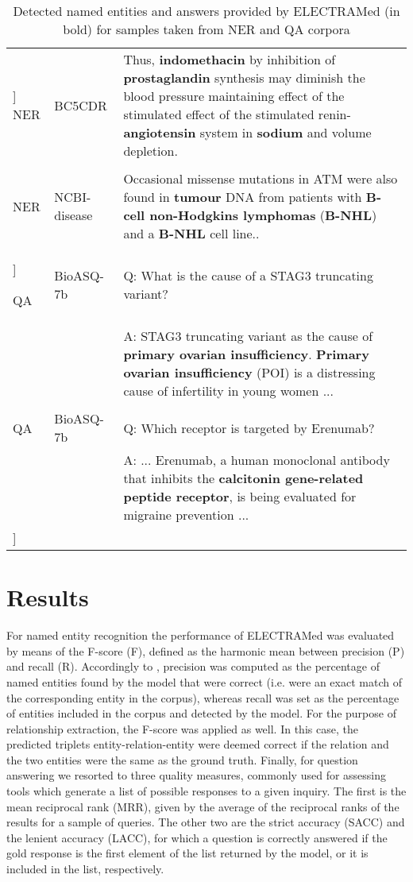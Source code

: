 \documentclass{article}
\begin{document}
\begin{table*}[!t]
\caption{Detected named entities and answers provided by ELECTRAMed (in bold) for samples taken from NER and QA corpora}
\label{table_samples}
\centering 
{\begin{tabular} {p{2cm}p{2cm}p{11cm}} 
\hline \-6pt]
NER & BC5CDR & Thus, \textbf{indomethacin} by inhibition of \textbf{prostaglandin} synthesis may diminish the blood pressure maintaining effect of the stimulated effect of the stimulated renin-\textbf{angiotensin} system in \textbf{sodium} and volume depletion. \\ 
    &   &   \\
NER & NCBI-disease & Occasional missense mutations in ATM were also found in \textbf{tumour} DNA from patients with \textbf{B-cell non-Hodgkins lymphomas} (\textbf{B-NHL}) and a \textbf{B-NHL} cell line.. \\ 
\-6pt]

QA & BioASQ-7b & Q: What is the cause of a STAG3 truncating variant? \\ 
  &           & A: STAG3 truncating variant as the cause of \textbf{primary ovarian insufficiency}. \textbf{Primary ovarian insufficiency} (POI) is a distressing cause of infertility in young women ... \\
    &   &   \\ 
QA & BioASQ-7b & Q: Which receptor is targeted by Erenumab? \\ 
  &           & A: ... Erenumab, a human monoclonal antibody that inhibits the \textbf{calcitonin gene-related peptide receptor}, is being evaluated for migraine prevention ... \\ 
\-6pt]  
\hline
\end{tabular}}{}
\end{table*}

\section{Results}
For named entity recognition the performance of ELECTRAMed was evaluated by means of the F-score (F), defined as the harmonic mean between precision (P) and recall (R).
Accordingly to \citep{Sang00}, precision was computed as the
percentage of named entities found by the model that were correct (i.e. were an exact match of the corresponding entity in the corpus), whereas recall was set as the percentage of entities included in the corpus and detected by the model.
For the purpose of relationship extraction, the F-score was applied as well.
In this case, the predicted triplets entity-relation-entity were deemed correct if the relation and the two entities were the same as the ground truth.
Finally, for question answering we resorted to three quality measures, commonly used for assessing tools which generate a list of possible responses to a given inquiry. 
The first is the mean reciprocal rank (MRR), given by the average of the reciprocal ranks of the results for a sample of queries.
The other two are the strict accuracy (SACC) and the lenient accuracy (LACC), for which a question is correctly answered if the gold response is the first element of the list returned by the model, or it is included in the list, respectively.
\end{document}

